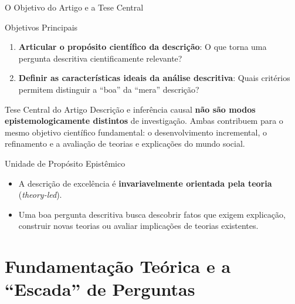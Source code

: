 \documentclass[
  ignorenonframetext,
  aspectratio=169,
  brazilian,
  t,
  10pt]{beamer}
\providecommand{\tightlist}{%
  \setlength{\itemsep}{0pt}\setlength{\parskip}{0pt}}
\begin{document}
\begin{frame}{O Objetivo do Artigo e a Tese Central}
\protect{}\label{o-objetivo-do-artigo-e-a-tese-central}
\begin{block}{Objetivos Principais}
\protect{}\label{objetivos-principais}
\begin{enumerate}
\tightlist
\item
  \textbf{Articular o propósito científico da descrição}: O que torna
  uma pergunta descritiva cientificamente relevante?
\item
  \textbf{Definir as características ideais da análise descritiva}:
  Quais critérios permitem distinguir a ``boa'' da ``mera'' descrição?
\end{enumerate}

\begin{block}{Tese Central do Artigo}
Descrição e inferência causal \textbf{não são modos epistemologicamente distintos} de investigação. Ambas contribuem para o mesmo objetivo científico fundamental: o desenvolvimento incremental, o refinamento e a avaliação de teorias e explicações do mundo social.
\end{block}
\end{block}

\begin{block}{Unidade de Propósito Epistêmico}
\protect{}\label{unidade-de-propuxf3sito-epistuxeamico}
\begin{itemize}
\tightlist
\item
  A descrição de excelência é \textbf{invariavelmente orientada pela
  teoria} (\emph{theory-led}).
\item
  Uma boa pergunta descritiva busca descobrir fatos que exigem
  explicação, construir novas teorias ou avaliar implicações de teorias
  existentes.
\end{itemize}
\end{block}
\end{frame}

\section{Fundamentação Teórica e a ``Escada'' de
Perguntas}\label{fundamentauxe7uxe3o-teuxf3rica-e-a-escada-de-perguntas}
\end{document}

